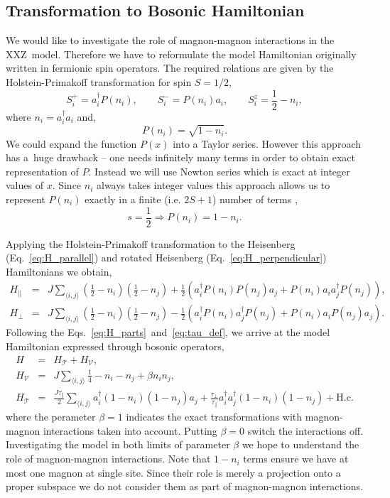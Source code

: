 \documentclass[12pt, a4paper]{article}
\newcommand{\mean}[1]{\langle#1\rangle}
\begin{document}
\subsection{Transformation to Bosonic Hamiltonian}
We would like to investigate the role of magnon-magnon interactions in the XXZ~model. Therefore we have to reformulate the model Hamiltonian originally written in fermionic spin operators. The required relations are given by the Holstein-Primakoff transformation for spin $S = 1/2$,
\begin{equation}
	S_i^+ = a_i^\dagger P(n_i), \quad\quad
	S_i^- = P(n_i) a_i, \quad\quad
	S_i^z = \frac{1}{2} - n_i,
\end{equation}
where $n_i = a_i^\dagger a_i$ and,
\begin{equation}
	P(n_i) = \sqrt{1 - n_i}.	
\end{equation}
We could expand the function $P(x)$ into a Taylor series. However this approach has a~huge drawback -- one needs infinitely many terms in order to obtain exact representation of $P$. Instead we will use Newton series which is exact at integer values of $x$. Since $n_i$ always takes integer values this approach allows us to represent $P(n_i)$ exactly in a finite (i.e. $2S+1$) number of terms \cite{knig2020newton}, 
\begin{equation}
	s = \frac{1}{2} \Rightarrow P(n_i) = 1 - n_i.
\end{equation}

Applying the Holstein-Primakoff transformation to the Heisenberg (Eq.~\ref{eq:H_parallel}) and rotated Heisenberg (Eq.~\ref{eq:H_perpendicular}) Hamiltonians we obtain,
\begin{eqnarray}
	H_{\parallel} &=& J\sum_{\mean{i,j}} \left(\frac{1}{2} - n_i\right) \left(\frac{1}{2} - n_j\right) + \frac{1}{2}\left(a_i^\dagger P(n_i) P(n_j) a_j + P(n_i) a_i a_j^\dagger P(n_j)\right), \\
	H_{\perp} &=& J\sum_{\mean{i,j}} \left(\frac{1}{2} - n_i\right) \left(\frac{1}{2} - n_j\right) - \frac{1}{2}\left(a_i^\dagger P(n_i) a_j^\dagger P(n_j) + P(n_i) a_i P(n_j) a_j\right).
\end{eqnarray}
Following the Eqs.~\ref{eq:H_parts}~and~\ref{eq:tau_def}, we arrive at the model Hamiltonian expressed through bosonic operators,
\begin{eqnarray}\label{eq:H_bosonic}
	H &=& H_{\mathcal{T}} + H_{\mathcal{V}}, \\
	H_{\mathcal{V}} &=& J\sum_{\mean{i,j}} \frac{1}{4} - n_i - n_j + \beta n_i n_j, \\
	H_{\mathcal{T}} &=& \frac{J\tau_{\parallel}}{2} \sum_{\mean{i,j}} a_i^\dagger (1-n_i)(1-n_j)a_j + \frac{\tau_{\perp}}{\tau_{\parallel}} a_i^\dagger a_j^\dagger (1-n_i) (1-n_j) + \text{H.c.}
\end{eqnarray}
where the perameter $\beta = 1$ indicates the exact transformations with magnon-magnon interactions taken into account. Putting $\beta = 0$ switch the interactions off. Investigating the model in both limits of parameter $\beta$ we hope to understand the role of magnon-magnon interactions. Note that $1-n_i$ terms ensure we have at most one magnon at single site. Since their role is merely a projection onto a proper subspace we do not consider them as part of magnon-magnon interactions. 
\end{document}
